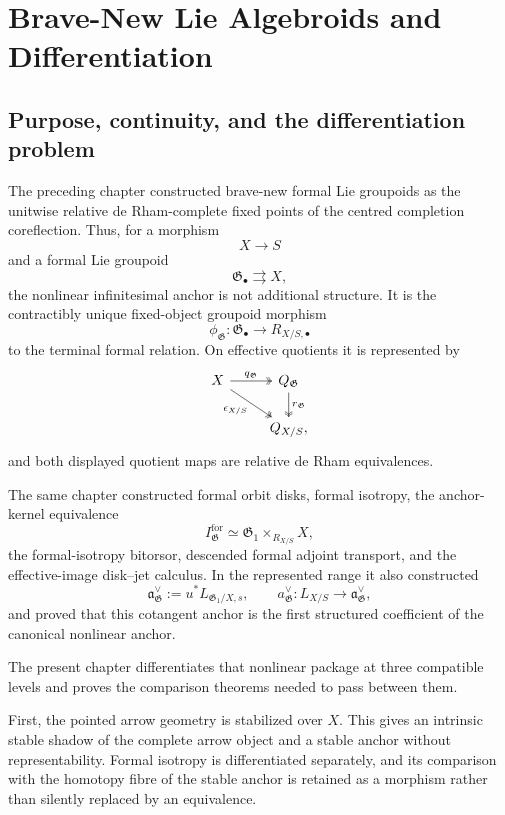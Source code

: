 \chapter{Brave-New Lie Algebroids and Differentiation}
\label{ch:brave-new-lie-algebroids}

\section{Purpose, continuity, and the differentiation problem}
\label{sec:bnla-purpose}

The preceding chapter constructed brave-new formal Lie groupoids as the
unitwise relative de Rham-complete fixed points of the centred completion
coreflection.  Thus, for a morphism
\[
    X\longrightarrow S
\]
and a formal Lie groupoid
\[
    \mathfrak G_\bullet\rightrightarrows X,
\]
the nonlinear infinitesimal anchor is not additional structure.  It is the
contractibly unique fixed-object groupoid morphism
\[
    \phi_{\mathfrak G}:
    \mathfrak G_\bullet
    \longrightarrow
    R_{X/S,\bullet}
\]
to the terminal formal relation.  On effective quotients it is represented by
\[
\begin{tikzcd}
X \arrow[r,two heads,"q_{\mathfrak G}"]
  \arrow[dr,two heads,"\epsilon_{X/S}"'] &
Q_{\mathfrak G}
  \arrow[d,two heads,"r_{\mathfrak G}"]\\
&Q_{X/S},
\end{tikzcd}
\]
and both displayed quotient maps are relative de Rham equivalences.

The same chapter constructed formal orbit disks, formal isotropy, the
anchor-kernel equivalence
\[
    I^{\mathrm{for}}_{\mathfrak G}
    \simeq
    \mathfrak G_1\times_{R_{X/S}}X,
\]
the formal-isotropy bitorsor, descended formal adjoint transport, and the
effective-image disk--jet calculus.  In the represented range it also
constructed
\[
    \mathfrak a_{\mathfrak G}^{\vee}
    :=u^*L_{\mathfrak G_1/X,s},
    \qquad
    a_{\mathfrak G}^{\vee}:
    L_{X/S}\longrightarrow\mathfrak a_{\mathfrak G}^{\vee},
\]
and proved that this cotangent anchor is the first structured coefficient of
the canonical nonlinear anchor.

The present chapter differentiates that nonlinear package at three compatible
levels and proves the comparison theorems needed to pass between them.

First, the pointed arrow geometry is stabilized over $X$.  This gives an
intrinsic stable shadow of the complete arrow object and a stable anchor
without representability.  Formal isotropy is differentiated separately, and
its comparison with the homotopy fibre of the stable anchor is retained as a
morphism rather than silently replaced by an equivalence.

